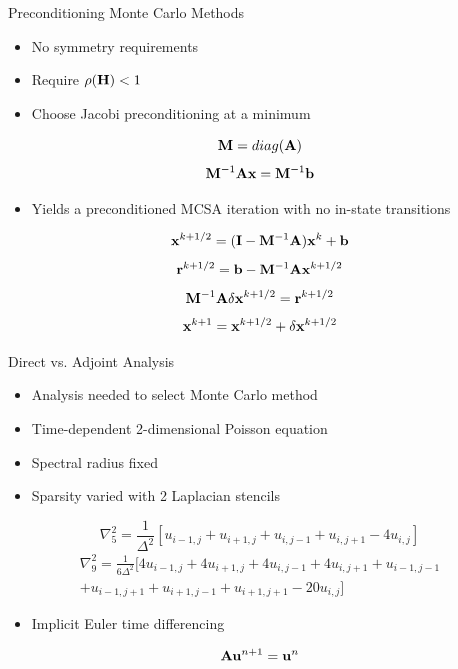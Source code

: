 \documentclass{beamer}
\begin{document}
\begin{frame}{Preconditioning Monte Carlo Methods}

  \begin{itemize}
  \item No symmetry requirements
  \item Require $\rho(\mathbf{H}) < 1$
  \item Choose Jacobi preconditioning at a minimum
  \end{itemize}

  \[
  \mathbf{M} = diag(\mathbf{A})
  \]
  \[
  \mathbf{M}^{-1}\mathbf{A}\mathbf{x} = \mathbf{M}^{-1}\mathbf{b}
  \]
  
  \medskip
  \begin{itemize}
  \item Yields a preconditioned MCSA iteration with no in-state
    transitions
  \end{itemize}

  \[
  \mathbf{x}^{k+1/2} = (\mathbf{I} - \mathbf{M}^{-1}\mathbf{A})\mathbf{x}^k + \mathbf{b}
  \]
  \[
  \mathbf{r}^{k+1/2} = \mathbf{b} - \mathbf{M}^{-1}\mathbf{A}\mathbf{x}^{k+1/2}
  \]
  \[
  \mathbf{M}^{-1}\mathbf{A}\delta\mathbf{x}^{k+1/2} = \mathbf{r}^{k+1/2}
  \]
  \[
  \mathbf{x}^{k+1} = \mathbf{x}^{k+1/2} + \delta \mathbf{x}^{k+1/2}
  \]

\end{frame}

\begin{frame}{Direct vs. Adjoint Analysis}

  \begin{itemize}
  \item Analysis needed to select Monte Carlo method
  \item Time-dependent 2-dimensional Poisson equation
  \item Spectral radius fixed
  \item Sparsity varied with 2 Laplacian stencils
  \end{itemize}

  \[
  \nabla^2_5 = \frac{1}{\Delta^2}[u_{i-1,j} + u_{i+1,j} + u_{i,j-1} +
    u_{i,j+1} - 4 u_{i,j}]
  \]
  \[
  \begin{split}
    \nabla^2_9 = \frac{1}{6\Delta^2}[4 u_{i-1,j} + 4 u_{i+1,j} + 4
      u_{i,j-1} + 4 u_{i,j+1} + u_{i-1,j-1}\\ + u_{i-1,j+1} +
      u_{i+1,j-1} + u_{i+1,j+1} - 20 u_{i,j}]
  \end{split}
  \]

  \begin{itemize}
  \item Implicit Euler time differencing
  \end{itemize}

  \[
  \mathbf{A} \mathbf{u}^{n+1} = \mathbf{u}^n
  \]

\end{frame}
\end{document}
